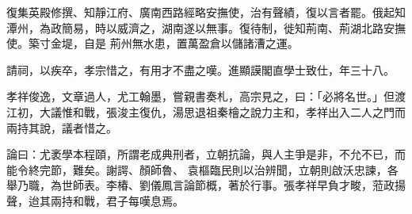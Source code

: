 \begin{pinyinscope}
 復集英殿修撰、知靜江府、廣南西路經略安撫使，治有聲績，復以言者罷。俄起知潭州，為政簡易，時以威濟之，湖南遂以無事。復待制，徙知荊南、荊湖北路安撫使。築寸金堤，自是
 荊州無水患，置萬盈倉以儲諸漕之運。



 請祠，以疾卒，孝宗惜之，有用才不盡之嘆。進顯謨閣直學士致仕，年三十八。



 孝祥俊逸，文章過人，尤工翰墨，嘗親書奏札，高宗見之，曰：「必將名世。」但渡江初，大議惟和戰，張浚主復仇，湯思退祖秦檜之說力主和，孝祥出入二人之門而兩持其說，議者惜之。



 論曰：尤袤學本程頤，所謂老成典刑者，立朝抗論，與人主爭是非，不允不已，而能令終完節，難矣。謝諤、顏師魯、
 袁樞臨民則以治辨聞，立朝則啟沃忠諫，各舉乃職，為世師表。李椿、劉儀鳳言論節概，著於行事。張孝祥早負才畯，蒞政揚聲，迨其兩持和戰，君子每嘆息焉。



\end{pinyinscope}